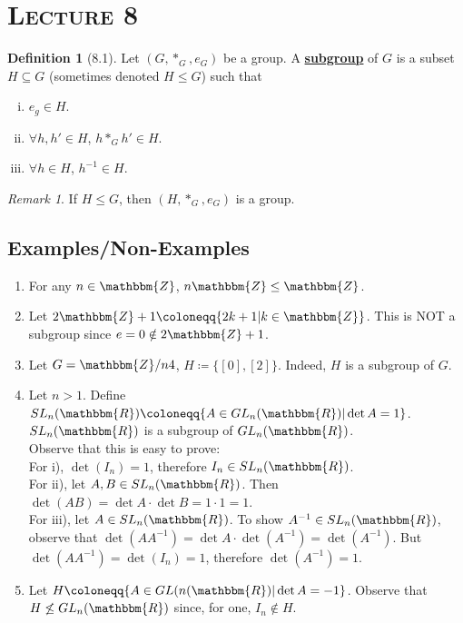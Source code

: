 \documentclass{article}
\newcommand{\Z}{\mathbbm{Z}}
\newcommand{\R}{\mathbbm{R}}
\newcommand{\coleq}{\coloneqq}
\newcommand{\inverse}[1]{#1^{-1}}
\newcommand{\define}[1]{\textbf{\underline{#1}}}
\theoremstyle{definition}
\newtheorem*{defn}{Definition}
\theoremstyle{remark}
\newtheorem*{rmk}{Remark}
\begin{document}
    \section*{\textbf{\textsc{Lecture 8}}}{
        \begin{defn}[8.1]
            Let $(G, *_G,e_G)$ be a group. A \define{subgroup} of $G$ is a subset $H \subseteq G$ (sometimes denoted $H \leq G$) such that
            \begin{enumerate}[i)]
                \item $e_g \in H$.
                \item $\forall h, h' \in H$, $h *_G h' \in H$.
                \item $\forall h \in H$, $\inverse{h} \in H$.
            \end{enumerate}
        \end{defn}
        
        \begin{rmk}
            If $H \leq G$, then $(H, *_G,e_G)$ is a group.
        \end{rmk}
        
        \subsection*{Examples/Non-Examples}{
            \begin{enumerate}
                \item For any $n \in \Z$, $n\Z \leq \Z$.
                \item Let $2\Z+1 \coleq \{2k+1|k \in \Z\}$. This is NOT a subgroup since $e=0 \notin 2\Z+1$.
                \item Let $G=\Z/n{4}$, $H \coleq \{[0],[2]\}$. Indeed, $H$ is a subgroup of $G$.
                \item Let $n>1$. Define $SL_n(\R)\coleq \{A \in GL_n(\R)|\det A=1\}$. $SL_n(\R)$ is a subgroup of $GL_n(\R)$.\\
                Observe that this is easy to prove:\\
                For i), $\det(I_n)=1$, therefore $I_n \in SL_n(\R)$.\\
                For ii), let $A,B \in SL_n(\R)$. Then $\det (AB) = \det A \cdot \det B = 1\cdot 1=1$.\\
                For iii), let $A \in SL_n(\R)$. To show $\inverse{A} \in SL_n(\R)$, observe that $\det(A\inverse{A})=\det A \cdot \det(A^{-1})=\det(\inverse{A})$. But $\det(A\inverse{A})=\det(I_n)=1$, therefore $\det(\inverse{A})=1$.
                \item Let $H\coleq \{A \in GL(n(\R)|\det A =-1\}$. Observe that $H \not \leq GL_n(\R)$ since, for one, $I_n \notin H$.
            \end{enumerate}
            
}}
\end{document}
